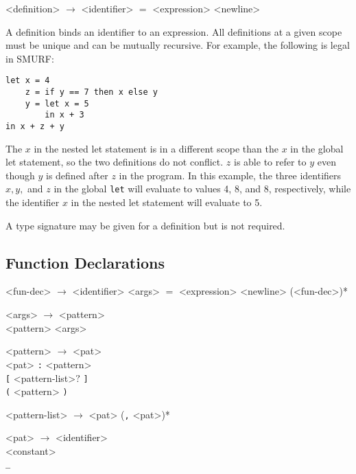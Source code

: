 \begin{grammar}

<definition> $\rightarrow$ <identifier> $=$ <expression> <newline>

\end{grammar}

A definition binds an identifier to an expression. All definitions at a given
scope must be unique and can be mutually recursive. For example, the following
is legal in SMURF:

\begin{verbatim}
let x = 4
  	z = if y == 7 then x else y
  	y = let x = 5 
        in x + 3 
in x + z + y
\end{verbatim}


The $x$ in the nested let statement is in a different scope than the $x$ in the global let statement, 
so the two definitions do not conflict. $z$ is able to refer to $y$ even though
$y$ is defined after $z$ in the program. In this example, the three 
identifiers $x, y, $ and $z$ in the global \texttt{let} will evaluate to values 4, 8, and 8, respectively,
while the identifier $x$ in the nested let statement will evaluate to 5.

A type signature may be given for a definition but is not required.

\subsection{Function Declarations}

\setlength{\grammarindent}{5em}
\begin{grammar}

<fun-dec> $\rightarrow$ <identifier> <args> $=$ <expression> <newline> (<fun-dec>)*

<args> $\rightarrow$ <pattern> \\ <pattern> <args> 


<pattern> $\rightarrow$ <pat> \\ <pat> \texttt{:} <pattern> \\ \texttt{[} <pattern-list>$?$ \texttt{]} \\
												\texttt{(} <pattern> \texttt{)} 

<pattern-list> $\rightarrow$ <pat> (\texttt{,} <pat>)* 

<pat> $\rightarrow$ <identifier> \\ <constant> \\ \texttt{_}
												
\end{grammar}


